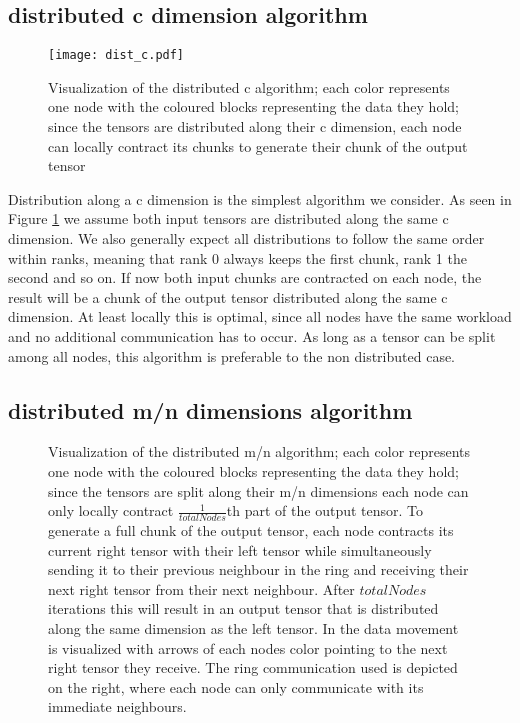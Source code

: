 \subsection{distributed c dimension algorithm}

\begin{figure}[h]
\centering\texttt{[image: dist\_c.pdf]}
\caption{Visualization of the distributed c algorithm; 
each color represents one node with the coloured blocks representing the data they hold; 
since the tensors are distributed along their c dimension, each node can locally contract its chunks to generate their chunk of the output tensor}
\label{fig:c_algo}
\end{figure}

Distribution along a c dimension is the simplest algorithm we consider. 
As seen in Figure \ref{fig:c_algo} we assume both input tensors are distributed along the same c dimension.
We also generally expect all distributions to follow the same order within ranks, meaning that rank 0 always keeps the first chunk, rank 1 the second and so on.
If now both input chunks are contracted on each node, the result will be a chunk of the output tensor distributed along the same c dimension.
At least locally this is optimal, since all nodes have the same workload and no additional communication has to occur.
As long as a tensor can be split among all nodes, this algorithm is preferable to the non distributed case.

\subsection{distributed m/n dimensions algorithm}

\begin{figure}[h]
\caption{Visualization of the distributed m/n algorithm; 
each color represents one node with the coloured blocks representing the data they hold; 
since the tensors are split along their m/n dimensions each node can only locally contract $\frac{1}{totalNodes}$th part of the output tensor.
To generate a full chunk of the output tensor, each node contracts its current right tensor with their left tensor while simultaneously sending it to their previous neighbour in the ring and receiving their next right tensor from their next neighbour.
After $totalNodes$ iterations this will result in an output tensor that is distributed along the same dimension as the left tensor.
In the data movement is visualized with arrows of each nodes color pointing to the next right tensor they receive.
The ring communication used is depicted on the right, where each node can only communicate with its immediate neighbours.
}
\label{fig:m_n_algo}
\end{figure}

